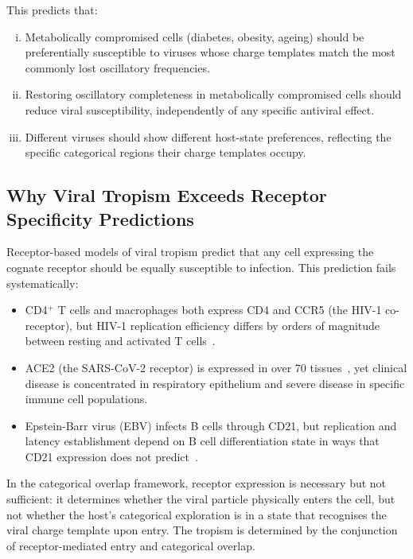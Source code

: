 \documentclass[11pt,twocolumn,a4paper]{article}
\theoremstyle{definition}
\theoremstyle{remark}
\begin{document}
This predicts that:
\begin{enumerate}[(i)]
  \item Metabolically compromised cells (diabetes, obesity, ageing) should be preferentially susceptible to viruses whose charge templates match the most commonly lost oscillatory frequencies.
  \item Restoring oscillatory completeness in metabolically compromised cells should reduce viral susceptibility, independently of any specific antiviral effect.
  \item Different viruses should show different host-state preferences, reflecting the specific categorical regions their charge templates occupy.
\end{enumerate}

\subsection{Why Viral Tropism Exceeds Receptor Specificity Predictions}

Receptor-based models of viral tropism predict that any cell expressing the cognate receptor should be equally susceptible to infection. This prediction fails systematically:

\begin{itemize}
  \item CD4$^+$ T cells and macrophages both express CD4 and CCR5 (the HIV-1 co-receptor), but HIV-1 replication efficiency differs by orders of magnitude between resting and activated T cells~\cite{Bukrinsky1991,Zack1990}.
  \item ACE2 (the SARS-CoV-2 receptor) is expressed in over 70 tissues~\cite{Zou2020}, yet clinical disease is concentrated in respiratory epithelium and severe disease in specific immune cell populations.
  \item Epstein-Barr virus (EBV) infects B cells through CD21, but replication and latency establishment depend on B cell differentiation state in ways that CD21 expression does not predict~\cite{Young1994}.
\end{itemize}

In the categorical overlap framework, receptor expression is necessary but not sufficient: it determines whether the viral particle physically enters the cell, but not whether the host's categorical exploration is in a state that recognises the viral charge template upon entry. The tropism is determined by the conjunction of receptor-mediated entry and categorical overlap.
\end{document}
